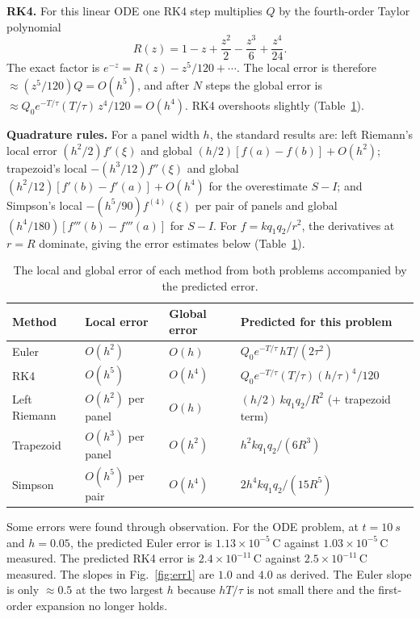 \documentclass[11pt]{article}
\begin{document}
\textbf{RK4.} For this linear ODE one RK4 step multiplies $Q$ by the fourth-order Taylor polynomial
\begin{equation}
  R(z) = 1 - z + \frac{z^2}{2} - \frac{z^3}{6} + \frac{z^4}{24}.
\end{equation}
The exact factor is $e^{-z} = R(z) - z^5/120 + \cdots$. The local error is therefore $\approx (z^5/120)Q = O(h^5)$, and after $N$ steps the global error is $\approx Q_0 e^{-T/\tau}(T/\tau)\,z^4/120 = O(h^4)$. RK4 overshoots slightly (Table~\ref{tab:errors}).

\textbf{Quadrature rules.} For a panel width $h$, the standard results are: left Riemann's local error $(h^2/2)f'(\xi)$ and global $(h/2)[f(a) - f(b)] + O(h^2)$; trapezoid's local $-(h^3/12)f''(\xi)$ and global $(h^2/12)[f'(b) - f'(a)] + O(h^4)$ for the overestimate $S - I$; and Simpson's local $-(h^5/90)f^{(4)}(\xi)$ per pair of panels and global $(h^4/180)[f'''(b) - f'''(a)]$ for $S - I$. For $f = kq_1q_2/r^2$, the derivatives at $r = R$ dominate, giving the error estimates below (Table~\ref{tab:errors}).

\begin{table}[htbp]
  \centering
  \caption{The local and global error of each method from both problems accompanied by the predicted error.}
  \label{tab:errors}
  \begin{tabular}{l l l l}
    \toprule
    Method & Local error & Global error & Predicted for this problem \\
    \midrule
    Euler         & $O(h^2)$          & $O(h)$   & $Q_0 e^{-T/\tau}\, hT/(2\tau^2)$ \\
    RK4           & $O(h^5)$          & $O(h^4)$ & $Q_0 e^{-T/\tau}(T/\tau)(h/\tau)^4/120$ \\
    Left Riemann  & $O(h^2)$ per panel & $O(h)$   & $(h/2)\,kq_1q_2/R^2$ (+ trapezoid term) \\
    Trapezoid     & $O(h^3)$ per panel & $O(h^2)$ & $h^2 kq_1q_2/(6R^3)$ \\
    Simpson       & $O(h^5)$ per pair  & $O(h^4)$ & $2h^4 kq_1q_2/(15R^5)$ \\
    \bottomrule
  \end{tabular}
\end{table}

Some errors were found through observation. For the ODE problem, at $t = \SI{10}{s}$ and $h = 0.05$, the predicted Euler error is $1.13\times10^{-5}$\,C against $1.03\times10^{-5}$\,C measured. The predicted RK4 error is $2.4\times10^{-11}$\,C against $2.5\times10^{-11}$\,C measured. The slopes in Fig.~\ref{fig:err1} are $1.0$ and $4.0$ as derived. The Euler slope is only $\approx 0.5$ at the two largest $h$ because $hT/\tau$ is not small there and the first-order expansion no longer holds.
\end{document}
